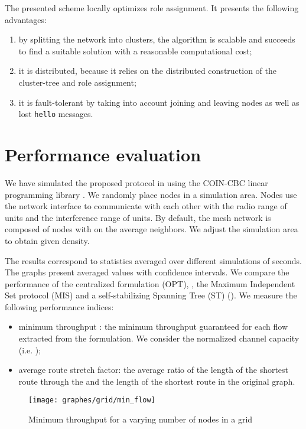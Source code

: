 \documentclass[twoside]{article}
\begin{document}
The presented scheme locally optimizes role assignment. It presents the following advantages:
\begin{enumerate}
\item by splitting the network into clusters, the algorithm is
  scalable and succeeds to find a suitable solution with a reasonable
  computational cost;
\item it is distributed, because it relies on the distributed
  construction of the cluster-tree and role assignment;
\item it is fault-tolerant by taking into account joining and leaving
  nodes as well as lost \texttt{hello} messages.
\end{enumerate}



\section{Performance evaluation}
\label{section:performance_evaluation}

We have simulated the proposed protocol in \wsnet\cite{wsnet} using
the COIN-CBC linear programming library \cite{coin-cbc}. We randomly
place nodes in a simulation area. Nodes use the  network
interface to communicate with each other with the radio range of 
units and the interference range of  units. By default, the mesh
network is composed of  nodes with on the average  neighbors. We
adjust the simulation area to obtain given density.

The results correspond to statistics averaged over  different
simulations of  seconds. The graphs present averaged values with
 confidence intervals. We compare the performance of the
centralized \milp formulation (OPT), \potatoes, the Maximum
Independent Set protocol (MIS) and a self-stabilizing Spanning Tree
(ST) (\cite{molecular_milp09rr}). We measure the following performance
indices:
\begin{itemize}
\item minimum throughput : the minimum throughput guaranteed
  for each flow extracted from the \milp formulation. We consider the
  normalized channel capacity (i.e. );
\item average route stretch factor: the average ratio of the length of
  the shortest route through the \rwcds and the length of the
  shortest route in the original graph.
\end{itemize}


\begin{figure}[!h]
\centering
	\texttt{[image: graphes/grid/min\_flow]}        
	\caption{Minimum throughput  for a varying number
          of nodes in a grid}
\label{fig:grid-min_flow}
\end{figure}
\end{document}
